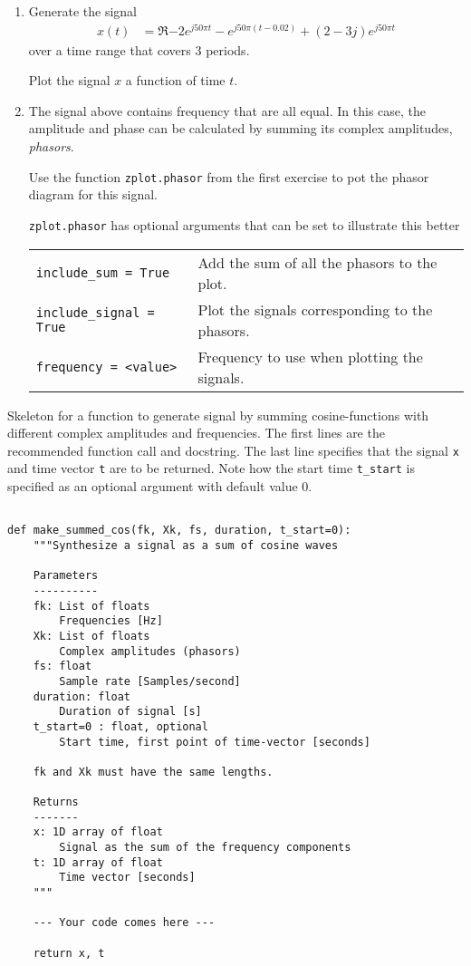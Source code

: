 \begin{enumerate}[1)]
	\item Generate the signal
	\begin{align*}
		x(t) &= \Re{-2e^{j50\pi t} - e^{j50\pi(t-0.02)} +(2-3j)e^{j50\pi t}   } 
	\end{align*}
	over a time range that covers 3 periods. 
	
	Plot the signal $x$ a function of time $t$.
	
	\item The signal above contains frequency that are all equal. In this case, the amplitude and phase can be calculated by summing its complex amplitudes, \emph{phasors}.
	
	Use the function \verb|zplot.phasor| from the first exercise to pot the phasor diagram for this signal.
	
	\verb|zplot.phasor| has optional arguments that can be set to illustrate this better
	
	\begin{tabular}{ll}
		\verb|include_sum = True| & Add the sum of all the phasors to the plot. \\
		\verb|include_signal = True| & Plot the signals corresponding to the phasors. \\
		\verb|frequency = <value>|  & Frequency to use when plotting the signals.
		
	\end{tabular}

\end{enumerate}

\begin{table}[t!]
	\caption{Skeleton for a function to generate signal by summing cosine-functions with different complex amplitudes and frequencies.		
	The first lines are the recommended function call and docstring. The last line specifies that the signal \texttt{x} and time vector \texttt{t} are to be returned. 	
	Note how the start time \texttt{t\_start} is specified as an optional argument with default value \num{0}.
	}
	\label{tab:summed_cos}
	
\begin{lstlisting}[style=pythonstyle]

def make_summed_cos(fk, Xk, fs, duration, t_start=0):
	"""Synthesize a signal as a sum of cosine waves

	Parameters
	----------
	fk: List of floats
		Frequencies [Hz]
	Xk: List of floats
		Complex amplitudes (phasors)
	fs: float
		Sample rate [Samples/second]
	duration: float
		Duration of signal [s]
	t_start=0 : float, optional
		Start time, first point of time-vector [seconds]
	
	fk and Xk must have the same lengths.

	Returns
	-------
	x: 1D array of float
		Signal as the sum of the frequency components
	t: 1D array of float
		Time vector [seconds]
	"""

	--- Your code comes here ---

	return x, t
	
\end{lstlisting}
\end{table}

